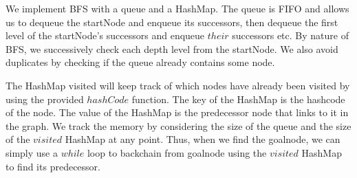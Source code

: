 \documentclass[a4paper]{report}
\begin{document}
We implement BFS with a queue and a HashMap. 
The queue is FIFO and allows us to dequeue the startNode and enqueue its successors, then dequeue the
first level of the startNode's successors and enqueue $their$ successors etc. By nature of BFS, we 
successively check each depth level from the startNode. We also avoid duplicates by checking if
the queue already contains some node. 

The HashMap visited will keep track of which nodes have already been 
visited by using the provided $hashCode$ function. The key of the HashMap is the hashcode of the node. 
The value of the HashMap is the predecessor node that links to it in the graph. We track the memory by considering the size of the queue
and the size of the $visited$ HashMap at any point. Thus, when we find the goalnode, we can simply use a 
$while$ loop to backchain from goalnode using the $visited$ HashMap to find its predecessor. 

\end{document}

